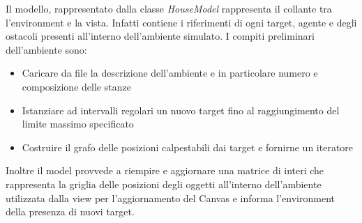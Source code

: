 Il modello, rappresentato dalla classe \textit{HouseModel} rappresenta il collante tra l'environment e la vista. Infatti contiene i riferimenti di ogni target, agente e degli ostacoli presenti all'interno dell'ambiente simulato. 
I compiti preliminari dell'ambiente sono:
\begin{itemize}
	\item Caricare da file la descrizione dell'ambiente e in particolare numero e composizione delle stanze
	\item Istanziare ad intervalli regolari un nuovo target fino al raggiungimento del limite massimo specificato
	\item Costruire il grafo delle posizioni calpestabili dai target e fornirne un iteratore
\end{itemize}
Inoltre il model provvede a riempire e aggiornare una matrice di interi che rappresenta la griglia delle posizioni degli oggetti all'interno dell'ambiente utilizzata dalla view per l'aggiornamento del Canvas e informa l'environment della presenza di nuovi target.